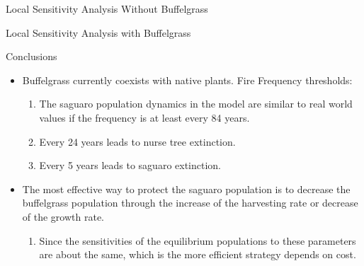\documentclass{beamer}
\begin{document}
\begin{frame}{Local Sensitivity Analysis Without Buffelgrass}

\begin{table}

\end{table}

\end{frame}

\begin{frame}{Local Sensitivity Analysis with Buffelgrass}


\begin{table}
\hspace{-.4cm}
\end{table}
\end{frame}

\begin{frame}{Conclusions}
\small{
\begin{itemize}
\item<1-> Buffelgrass currently coexists with native plants. Fire Frequency thresholds:
\begin{enumerate}
\item<2-> The saguaro population dynamics in the model are similar to real world values if the frequency is at least every 84 years.
\item<3-> Every 24 years leads to nurse tree extinction.
\item<4-> Every 5 years leads to saguaro extinction.
\end{enumerate}
\item<5-> The most effective way to protect the saguaro population is to decrease the buffelgrass population through the increase of the harvesting rate or decrease of the growth rate.
\begin{enumerate}
\item<6-> Since the sensitivities of the equilibrium populations to these parameters are about the same, which is the more efficient strategy depends on cost.
\end{enumerate}
\end{itemize}}
\end{frame}
\end{document}
